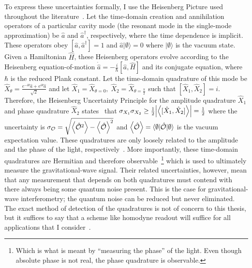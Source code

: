 To express these uncertainties formally, I use the Heisenberg Picture used throughout the literature~\cite{Danilishin,}. Let the time-domain creation and annihilation operators of a particular cavity mode (the resonant mode in the single-mode approximation) be $\hat{a}$ and $\hat{a}^\dag$, respectively, where the time dependence is implicit. These operators obey $[\hat{a},\hat{a}^\dag]=1$ and $\hat{a}\lvert\emptyset\rangle=0$ where $\lvert\emptyset\rangle$ is the vacuum state. Given a Hamiltonian $\hat H$, these Heisenberg operators evolve according to the Heisenberg equation-of-motion $\dot{\hat{a}}=-\frac{i}{\hbar} [\hat a, \hat H]$ and its conjugate equation, where $\hbar$ is the reduced Plank constant. Let the time-domain quadrature of this mode be $\hat{X}_\theta=\frac{e^{-i \theta}\hat{a}+e^{i \theta}\hat{a}}{\sqrt 2}$ and let $\hat{X}_1=\hat{X}_{\theta=0},\; \hat{X}_2=\hat{X}_{\theta=\frac{\pi}{2}}$ such that $[\hat{X}_1,\hat{X}_2]=i$. Therefore, the Heisenberg Uncertainty Principle for the amplitude quadrature $\hat{X}_1$ and phase quadrature $\hat{X}_2$ states~\cite{} that $\sigma_{X_1}\sigma_{X_2}\geq\frac{1}{2}\abs{\ev{[\hat{X}_1,\hat{X}_2]}}=\frac{1}{2}$  where the uncertainty is $\sigma_\mathcal{O}=\sqrt{\ev{\hat{\mathcal{O}}^2}-\ev{\hat{\mathcal{O}}}^2}$ and $\ev{\hat{\mathcal{O}}}=\langle\emptyset\lvert\hat{\mathcal{O}}\rvert\emptyset\rangle$ is the vacuum expectation value. These quadratures are only loosely related to the amplitude and the phase of the light, respectively~\cite{Danilishin}. More importantly, these time-domain quadratures are Hermitian and therefore observable~\footnote{Which is what is meant by ``measuring the phase'' of the light. Even though absolute phase is not real, the phase quadrature is observable.} which is used to ultimately measure the gravitational-wave signal. Their related uncertainties, however, mean that any measurement that depends on both quadratures must contend with there always being some quantum noise present. This is the case for gravitational-wave interferometry; the quantum noise can be reduced but never eliminated.
The exact method of detection of the quadratures is not of concern to this thesis, but it suffices to say that a scheme like homodyne readout will suffice for all applications that I consider~\cite{}.

